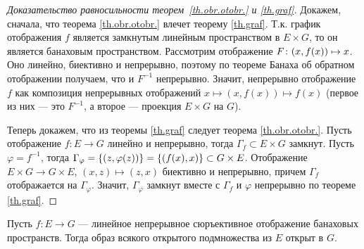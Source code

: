 \documentclass[10pt]{article}
\newcommand*{\p}[1]{#1\nobreak\discretionary{}{\hbox{$\mathsurround=0pt #1$}}{}}
\begin{document}
\begin{proof}[Доказательство равносильности теорем~\ref{th.obr.otobr.} и \ref{th.graf}]
Докажем, сначала, что теорема \ref{th.obr.otobr.} влечет теорему
\ref{th.graf}. Т.к. график отображения $f$ является замкнутым
линейным пространством в $E\times G$, то он является банаховым
пространством. Рассмотрим отображение $F\colon (x,f(x))\p\mapsto x$.
Оно линейно, биективно и непрерывно, поэтому по теореме Банаха об
обратном отображении получаем, что и $F^{-1}$ непрерывно. Значит,
непрерывно отображение $f$ как композиция непрерывных отображений
$x\mapsto (x,f(x))\mapsto f(x)$ (первое из них --- это $F^{-1}$, а
второе --- проекция $E\times G$ на $G$).

Теперь докажем, что из теоремы \ref{th.graf} следует теорема
\ref{th.obr.otobr.}. Пусть отображение $f\colon E\to G$ линейно и
непрерывно, тогда $\Gamma_f\subset E\times G$ замкнут. Пусть
$\varphi=f^{-1}$, тогда
$\Gamma_\varphi=\{(z,\varphi(z))\}\p=\{(f(x),x)\}\p\subset G\times
E$. Отображение $E\times G\to G\times E$, $(x,z)\mapsto (z,x)$
биективно и непрерывно, причем $\Gamma_f$ отображается на
$\Gamma_\varphi$. Значит, $\Gamma_\varphi$ замкнут вместе с
$\Gamma_f$ и $\varphi$ непрерывно по теореме \ref{th.graf}.
\end{proof}

\begin{theorem}
Пусть $f\colon E\to G$ --- линейное непрерывное сюръективное
отображение банаховых пространств. Тогда образ всякого открытого
подмножества из $E$ открыт в $G$.
\end{theorem}
\end{document}
